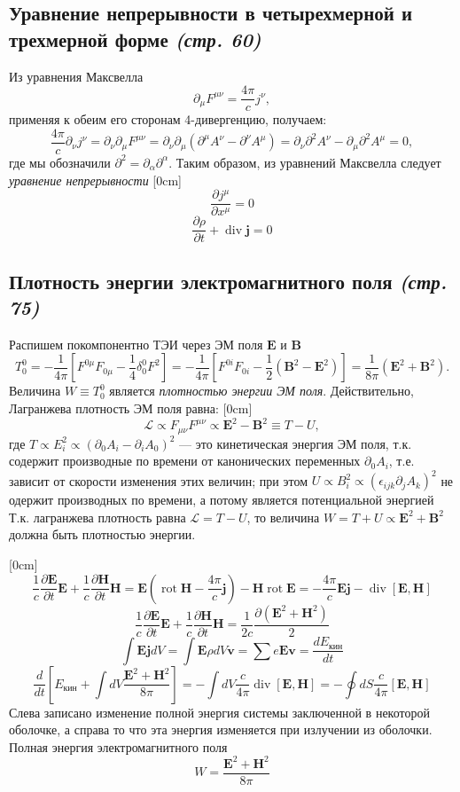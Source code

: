 \documentclass[a4paper,12pt]{article}
\begin{document}
\subsection{Уравнение непрерывности в четырехмерной и трехмерной форме 
\emph{(стр. 60)}}
Из уравнения Максвелла
\[
	\partial_\mu F^{\mu\nu}=\frac{4\pi}{c}j^\nu
,\] 
применяя к обеим его сторонам 4-дивергенцию, получаем:
\[
\frac{4\pi}{c}\partial_\nu j^\nu=\partial_\nu \partial_\mu F^{\mu\nu}=
\partial_\nu \partial_\mu (\partial^{\mu} A^\nu-\partial^\nu A^\mu)=
\partial_\nu \partial^2 A^\nu-\partial_\mu \partial^2 A^\mu=0
,\] 
где мы обозначили $\partial^2=\partial_\alpha \partial^\alpha$. Таким образом,
из уравнений Максвелла следует \emph{уравнение непрерывности}
[0cm]
\[\frac{\partial j^\mu}{\partial x^\mu}=0\]
\[
\frac{\partial \rho}{\partial t}+\operatorname{div} \mathbf{j}=0
\]
\subsection{Плотность энергии электромагнитного поля \emph{(стр. 75)}}
Распишем покомпонентно ТЭИ через ЭМ поля  $\mathbf{E}$ и
$\mathbf{B}$
\[
T_0^0=-\frac{1}{4\pi}\left[ F^{0\mu}F_{0\mu}-\frac{1}{4}\delta_0^0 F^2 \right]=
-\frac{1}{4\pi}\left[ F^{0i}F_{0i}-\frac{1}{2}\left( \mathbf{B}^2-\mathbf{E}^2
\right) \right] =\frac{1}{8\pi}\left( \mathbf{E}^2+\mathbf{B}^2 \right) 
.\] 
Величина $W\equiv T_0^0$ является  \emph{плотностью энергии ЭМ поля}.
Действительно, Лагранжева плотность ЭМ поля равна:
[0cm]
\[
\mathcal{L}\propto F_{\mu\nu}F^{\mu\nu}\propto\mathbf{E}^2-\mathbf{B}^2\equiv
T-U
,\]
где $T \propto E_i^2\propto\left(\partial_0A_i-\partial_iA_0\right)^2$ ---
это кинетическая энергия ЭМ поля,  т.\:к. содержит производные по времени
от канонических переменных $\partial_0 A_i$,  т.\:е. зависит от скорости
изменения этих величин; при этом $U \propto B_i^2 \propto \left( 
\epsilon_{ijk}\partial_j A_k\right) ^2$ не  одержит производных по времени, а
потому является потенциальной энергией
Т.\:к. лагранжева плотность равна $\mathcal{L}=T-U$, то величина $W=T+U\propto
\mathbf{E}^2+\mathbf{B}^2$ должна быть плотностью энергии. 

[0cm]
\[
\frac{1}{c}\frac{\partial \mathbf{E}}{\partial t}\mathbf{E}+\frac{1}{c}\frac{\partial \mathbf{H}}{\partial t}\mathbf{H}=\mathbf{E}\left(\operatorname{rot}\mathbf{H}-\frac{4\pi}{c}\mathbf{j}\right)-\mathbf{H}\operatorname{rot}\mathbf{E}=-\frac{4\pi}{c}\mathbf{E}\mathbf{j}-\operatorname{div}{[\mathbf{E},\mathbf{H}]}
\]
\[
\frac{1}{c}\frac{\partial \mathbf{E}}{\partial t}\mathbf{E}+\frac{1}{c}\frac{\partial \mathbf{H}}{\partial t}\mathbf{H}=\frac{1}{2c}\frac{\partial (\mathbf{E}^2+\mathbf{H}^2)}{2}
\]
\[\int \mathbf{E}\mathbf{j} dV=\int \mathbf{E}\rho dV \mathbf{v}=\sum e\mathbf{E}\mathbf{v}=\frac{dE_{\text{кин}}}{dt}\]
\[\frac{d}{dt}\left[E_{\text{кин}}+\int dV\frac{\mathbf{E}^2+\mathbf{H}^2}{8\pi}\right]=-\int dV\frac{c}{4\pi}\operatorname{div}{[\mathbf{E},\mathbf{H}]}=-\oint dS \frac{c}{4\pi}[\mathbf{E},\mathbf{H}]\]
Слева записано изменение полной энергия системы заключенной в некоторой оболочке, а справа то что эта энергия изменяется при излучении из оболочки. Полная энергия электромагнитного поля 
\[W=\frac{\mathbf{E}^2+\mathbf{H}^2}{8\pi}\]
\end{document}
